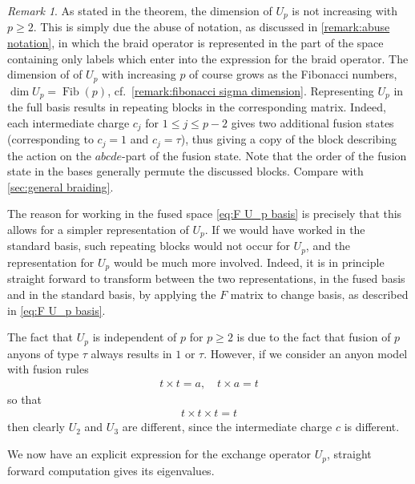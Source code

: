\documentclass[a4paper,10pt,oneside]{book}
\theoremstyle{plain}
\theoremstyle{definition}
\theoremstyle{remark}
\newtheorem{remark}{Remark}[section]
\begin{document}
\begin{remark}
  As stated in the theorem, the dimension of $U_p$ is not increasing with $p \ge 2$. This is simply due the abuse of notation, as discussed in \cref{remark:abuse notation}, in which the braid operator is represented in the part of the space containing only labels which enter into the expression for the braid operator. The dimension of of $U_p$ with increasing $p$ of course grows as the Fibonacci numbers, $\operatorname{dim} U_p = \operatorname{Fib}(p)$, cf.\ \cref{remark:fibonacci sigma dimension}. Representing $U_p$ in the full basis results in repeating blocks in the corresponding matrix. Indeed, each intermediate charge $c_j$ for $1 \le j \le p-2$ gives two additional fusion states (corresponding to $c_j = 1$ and $c_j = τ$), thus giving a copy of the block describing the action on the $abcde$-part of the fusion state. Note that the order of the fusion state in the bases generally permute the discussed blocks. Compare with \cref{sec:general braiding}.

  The reason for working in the fused space \cref{eq:F U_p basis} is precisely that this allows for a simpler representation of $U_p$. If we would have worked in the standard basis, such repeating blocks would not occur for $U_p$, and the representation for $U_p$ would be much more involved. Indeed, it is in principle straight forward to transform between the two representations, in the fused basis and in the standard basis, by applying the $F$ matrix to change basis, as described in \cref{eq:F U_p basis}.

  The fact that $U_p$ is independent of $p$ for $p \ge 2$ is due to the fact that fusion of $p$ anyons of type $τ$ always results in $1$ or $\tau$. However, if we consider an anyon model with fusion rules
  \begin{align*}
    t \times t = a, \quad
    t \times a = t
  \end{align*}
  so that
  \begin{align*}
    t \times t \times t = t
  \end{align*}
  then clearly $U_2$ and $U_3$ are different, since the intermediate charge $c$ is different.
\end{remark}

We now have an explicit expression for the exchange operator $U_p$, straight forward computation gives its eigenvalues.
\end{document}
